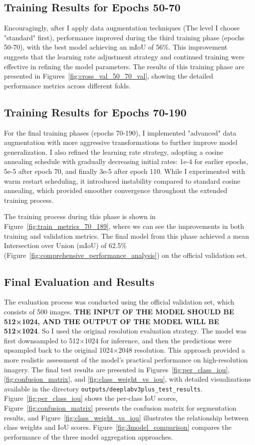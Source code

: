 \documentclass[]{article}
\begin{document}
\subsection{Training Results for Epochs 50-70}
Encouragingly, after I apply data augmentation techniques (The level I choose "standard" first), performance improved during the third training phase (epochs 50-70), with the best model achieving an mIoU of 56\%. This improvement suggests that the learning rate adjustment strategy and continued training were effective in refining the model parameters. The results of this training phase are presented in Figures~\ref{fig:cross_val_50_70_val}, showing the detailed performance metrics across different folds.

\subsection{Training Results for Epochs 70-190}
For the final training phases (epochs 70-190), I implemented "advanced" data augmentation with more aggressive transformations to further improve model generalization. I also refined the learning rate strategy, adopting a cosine annealing schedule with gradually decreasing initial rates: 1e-4 for earlier epochs, 5e-5 after epoch 70, and finally 3e-5 after epoch 110. While I experimented with warm restart scheduling, it introduced instability compared to standard cosine annealing, which provided smoother convergence throughout the extended training process.

The training process during this phase is shown in Figure~\ref{fig:train_metrics_70_189}, where we can see the improvements in both training and validation metrics. The final model from this phase achieved a mean Intersection over Union (mIoU) of 62.5\% (Figure~\ref{fig:comprehensive_performance_analysis}) on the official validation set.

\subsection{Final Evaluation and Results}\label{sec:Final_Evaluation}
The evaluation process was conducted using the official validation set, which consists of 500 images. \textbf{THE INPUT OF THE MODEL SHOULD BE 512×1024, AND THE OUTPUT OF THE MODEL WILL BE 512×1024}. So I used the original resolution evaluation strategy. The model was first downsampled to 512×1024 for inference, and then the predictions were upsampled back to the original 1024×2048 resolution. This approach provided a more realistic assessment of the model's practical performance on high-resolution imagery.
The final test results are presented in Figures~\ref{fig:per_class_iou}, \ref{fig:confusion_matrix}, and \ref{fig:class_weight_vs_iou}, with detailed visualizations available in the directory \texttt{outputs/deeplabv3plus\_test\_results}. Figure~\ref{fig:per_class_iou} shows the per-class IoU scores, Figure~\ref{fig:confusion_matrix} presents the confusion matrix for segmentation results, and Figure~\ref{fig:class_weight_vs_iou} illustrates the relationship between class weights and IoU scores. Figure~\ref{fig:3model_comparison} compares the performance of the three model aggregation approaches.
\end{document}

